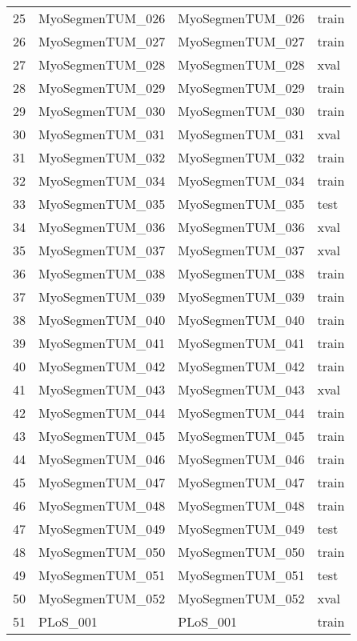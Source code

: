 \begin{tabular}{llll}
25  &  MyoSegmenTUM\_026 &  MyoSegmenTUM\_026 &  train \\
26  &  MyoSegmenTUM\_027 &  MyoSegmenTUM\_027 &  train \\
27  &  MyoSegmenTUM\_028 &  MyoSegmenTUM\_028 &   xval \\
28  &  MyoSegmenTUM\_029 &  MyoSegmenTUM\_029 &  train \\
29  &  MyoSegmenTUM\_030 &  MyoSegmenTUM\_030 &  train \\
30  &  MyoSegmenTUM\_031 &  MyoSegmenTUM\_031 &   xval \\
31  &  MyoSegmenTUM\_032 &  MyoSegmenTUM\_032 &  train \\
32  &  MyoSegmenTUM\_034 &  MyoSegmenTUM\_034 &  train \\
33  &  MyoSegmenTUM\_035 &  MyoSegmenTUM\_035 &   test \\
34  &  MyoSegmenTUM\_036 &  MyoSegmenTUM\_036 &   xval \\
35  &  MyoSegmenTUM\_037 &  MyoSegmenTUM\_037 &   xval \\
36  &  MyoSegmenTUM\_038 &  MyoSegmenTUM\_038 &  train \\
37  &  MyoSegmenTUM\_039 &  MyoSegmenTUM\_039 &  train \\
38  &  MyoSegmenTUM\_040 &  MyoSegmenTUM\_040 &  train \\
39  &  MyoSegmenTUM\_041 &  MyoSegmenTUM\_041 &  train \\
40  &  MyoSegmenTUM\_042 &  MyoSegmenTUM\_042 &  train \\
41  &  MyoSegmenTUM\_043 &  MyoSegmenTUM\_043 &   xval \\
42  &  MyoSegmenTUM\_044 &  MyoSegmenTUM\_044 &  train \\
43  &  MyoSegmenTUM\_045 &  MyoSegmenTUM\_045 &  train \\
44  &  MyoSegmenTUM\_046 &  MyoSegmenTUM\_046 &  train \\
45  &  MyoSegmenTUM\_047 &  MyoSegmenTUM\_047 &  train \\
46  &  MyoSegmenTUM\_048 &  MyoSegmenTUM\_048 &  train \\
47  &  MyoSegmenTUM\_049 &  MyoSegmenTUM\_049 &   test \\
48  &  MyoSegmenTUM\_050 &  MyoSegmenTUM\_050 &  train \\
49  &  MyoSegmenTUM\_051 &  MyoSegmenTUM\_051 &   test \\
50  &  MyoSegmenTUM\_052 &  MyoSegmenTUM\_052 &   xval \\
51  &          PLoS\_001 &          PLoS\_001 &  train \\

\end{tabular}
